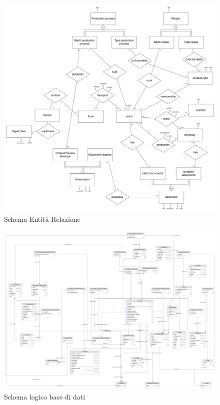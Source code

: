 \documentclass[a4paper,11pt]{article}
\begin{document}
\begin{figure}[H]
  \includegraphics[height=1\linewidth, angle=-90]{img/schemaER.png}
  \caption{Schema Entità-Relazione}
  \label{fig:schemaer}
\end{figure}


\begin{figure}[H]
  \includegraphics[height=1\linewidth, angle=-90]{img/db.png}
  \caption{Schema logico base di dati}
  \label{fig:schemauml}
\end{figure}
\end{document}
